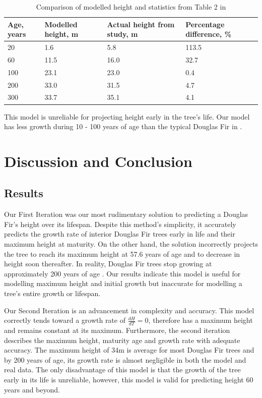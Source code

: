 \documentclass[twocolumn]{article} %
\begin{document}
\begin{table}[ht]
\centering
\begin{tabular}{|p{1cm}|p{1.5cm}|p{1.5cm}|p{1.5cm}|}
\hline
Age, years & Modelled height, m & Actual height from study, m & Percentage difference, \% \\ \hline
20  & 1.6  & 5.8  & 113.5 \\ \hline
60  & 11.5 & 16.0 & 32.7  \\ \hline
100 & 23.1 & 23.0 & 0.4   \\ \hline
200 & 33.0 & 31.5 & 4.7   \\ \hline
300 & 33.7 & 35.1 & 4.1   \\ \hline
\end{tabular}
\caption{Comparison of modelled height and statistics from Table 2 in \cite{eight}}
\label{tab:my-table}
\end{table}

This model is unreliable for projecting height early in the tree’s life. Our model has less growth during 10 - 100 years of age than the typical Douglas Fir in \cite{eight}.





\section{Discussion and Conclusion}
\subsection{Results}

Our First Iteration was our most rudimentary solution to predicting a Douglas Fir’s height over its lifespan. Despite this method’s simplicity, it accurately predicts the growth rate of interior Douglas Fir trees early in life and their maximum height at maturity. On the other hand, the solution incorrectly projects the tree to reach its maximum height at 57.6 years of age and to decrease in height soon thereafter. In reality, Douglas Fir trees stop growing at approximately 200 years of age \cite{three}. Our results indicate this model is useful for modelling maximum height and initial growth but inaccurate for modelling a tree’s entire growth or lifespan.

Our Second Iteration is an advancement in complexity and accuracy. This model correctly tends toward a growth rate of $\frac{dH}{dT} = 0 $, therefore has a maximum height and remains constant at its maximum. Furthermore, the second iteration describes the maximum height, maturity age and growth rate with adequate accuracy. The maximum height of 34m is average for most Douglas Fir trees and by 200 years of age, its growth rate is almost negligible in both the model and real data. The only disadvantage of this model is that the growth of the tree early in its life is unreliable, however, this model is valid for predicting height 60 years and beyond.
\end{document}
